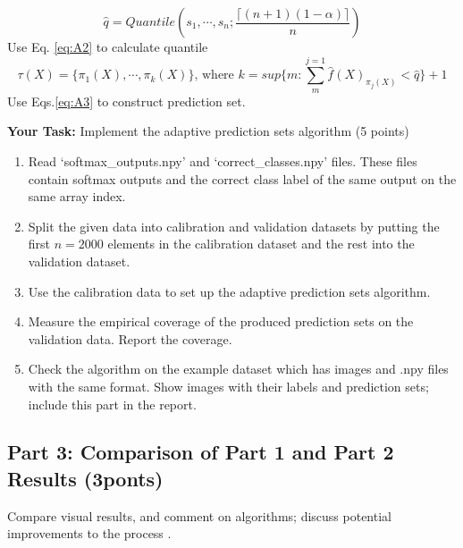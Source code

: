 \documentclass[11pt, oneside]{article}   	%
\begin{document}
\begin{equation}\label{eq:A2}
\hat{q}=Quantile(s_1,\cdots,s_n;\frac{\lceil (n+1)(1-\alpha) \rceil}{n})
\end{equation}
Use Eq. \ref{eq:A2} to calculate quantile
\begin{equation}\label{eq:A3}
\tau (X) =\{ \pi_1(X),\cdots,\pi_k(X)\}
\text{, where } k=sup \{m:\sum_{m}^{j=1}\hat{f}(X)_{\pi_j(X)}<\hat{q}\}+1
\end{equation}
Use Eqs.\ref{eq:A3} to construct prediction set.

\textbf{Your Task:} Implement the adaptive prediction sets algorithm (5 points)
\begin{enumerate}
    \item Read `softmax\_outputs.npy' and `correct\_classes.npy' files. These files contain softmax outputs and the correct class label of the same output on the same array index.
    \item Split the given data into calibration and validation datasets by putting the first \( n = 2000 \) elements in the calibration dataset and the rest into the validation dataset.
    
    \item Use the calibration data to set up the adaptive prediction sets algorithm.
    
    \item Measure the empirical coverage of the produced prediction sets on the validation data. Report the coverage.
    
    \item Check the algorithm on the example dataset which has images and .npy files with the same format. Show images with their labels and prediction sets; include this part in the report.
\end{enumerate}

\subsection*{Part 3: Comparison  of Part 1 and Part 2 Results (3ponts)} Compare visual results, and comment on algorithms; discuss potential improvements to the process .
\end{document}
